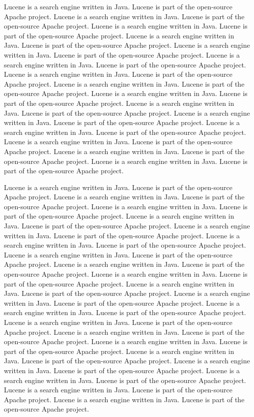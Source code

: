 \documentclass[11pt]{book}
\begin{document}
\noindent
Lucene is a search engine written in Java.  Lucene is part of the
open-source Apache project.
Lucene is a search engine written in Java.  Lucene is part of the
open-source Apache project.
Lucene is a search engine written in Java.  Lucene is part of the
open-source Apache project.
Lucene is a search engine written in Java.  Lucene is part of the
open-source Apache project.
Lucene is a search engine written in Java.  Lucene is part of the
open-source Apache project.
Lucene is a search engine written in Java.  Lucene is part of the
open-source Apache project.
Lucene is a search engine written in Java.  Lucene is part of the
open-source Apache project.
Lucene is a search engine written in Java.  Lucene is part of the
open-source Apache project.
Lucene is a search engine written in Java.  Lucene is part of the
open-source Apache project.
Lucene is a search engine written in Java.  Lucene is part of the
open-source Apache project.
Lucene is a search engine written in Java.  Lucene is part of the
open-source Apache project.
Lucene is a search engine written in Java.  Lucene is part of the
open-source Apache project.
Lucene is a search engine written in Java.  Lucene is part of the
open-source Apache project.
Lucene is a search engine written in Java.  Lucene is part of the
open-source Apache project.
Lucene is a search engine written in Java.  Lucene is part of the
open-source Apache project.

Lucene is a search engine written in Java.  Lucene is part of the
open-source Apache project.
Lucene is a search engine written in Java.  Lucene is part of the
open-source Apache project.
Lucene is a search engine written in Java.  Lucene is part of the
open-source Apache project.
Lucene is a search engine written in Java.  Lucene is part of the
open-source Apache project.
Lucene is a search engine written in Java.  Lucene is part of the
open-source Apache project.
Lucene is a search engine written in Java.  Lucene is part of the
open-source Apache project.
Lucene is a search engine written in Java.  Lucene is part of the
open-source Apache project.
Lucene is a search engine written in Java.  Lucene is part of the
open-source Apache project.
Lucene is a search engine written in Java.  Lucene is part of the
open-source Apache project.
Lucene is a search engine written in Java.  Lucene is part of the
open-source Apache project.
Lucene is a search engine written in Java.  Lucene is part of the
open-source Apache project.
Lucene is a search engine written in Java.  Lucene is part of the
open-source Apache project.
Lucene is a search engine written in Java.  Lucene is part of the
open-source Apache project.
Lucene is a search engine written in Java.  Lucene is part of the
open-source Apache project.
Lucene is a search engine written in Java.  Lucene is part of the
open-source Apache project.
Lucene is a search engine written in Java.  Lucene is part of the
open-source Apache project.
Lucene is a search engine written in Java.  Lucene is part of the
open-source Apache project.
Lucene is a search engine written in Java.  Lucene is part of the
open-source Apache project.
Lucene is a search engine written in Java.  Lucene is part of the
open-source Apache project.
Lucene is a search engine written in Java.  Lucene is part of the
open-source Apache project.
\end{document}
